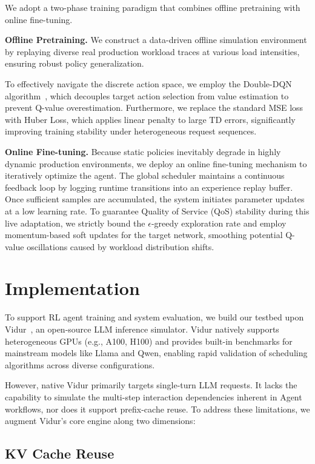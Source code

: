 \documentclass[sigconf,review,anonymous]{acmart}
\begin{document}
We adopt a two-phase training paradigm that combines offline pretraining 
with online fine-tuning.

\textbf{Offline Pretraining.}
We construct a data-driven offline simulation environment by replaying
diverse real production workload traces at various load intensities, 
ensuring robust policy generalization.

To effectively navigate the discrete action space, we employ the
Double-DQN algorithm~\cite{van2016deep}, which decouples
target action selection from value estimation to prevent Q-value
overestimation. 
Furthermore, we replace the standard MSE loss with Huber Loss, which
applies linear penalty to large TD errors, significantly improving
training stability under heterogeneous request sequences.

\textbf{Online Fine-tuning.}
Because static policies inevitably degrade in highly dynamic production environments, 
we deploy an online fine-tuning mechanism to iteratively optimize the agent. The global 
scheduler maintains a continuous feedback loop by logging runtime transitions into an 
experience replay buffer. Once sufficient samples are accumulated, the system initiates 
parameter updates at a low learning rate. To guarantee Quality of Service (QoS) stability 
during this live adaptation, 
we strictly bound the $\epsilon$-greedy exploration rate and employ momentum-based soft 
updates for the target network, smoothing potential Q-value oscillations caused by workload 
distribution shifts.

\section{Implementation}\label{sec:implementation}

To support RL agent training and system evaluation, we build our testbed upon 
Vidur~\cite{agrawal2024vidur}, an open-source LLM inference simulator. 
Vidur natively supports heterogeneous GPUs (e.g., A100, H100) and provides 
built-in benchmarks for mainstream models like Llama and Qwen, enabling rapid 
validation of scheduling algorithms across diverse configurations.

However, native Vidur primarily targets single-turn LLM requests. 
It lacks the capability to simulate the multi-step interaction dependencies 
inherent in Agent workflows, nor does it support prefix-cache reuse. 
To address these limitations, we augment Vidur's core engine along two dimensions:

\subsection{KV Cache Reuse}
\end{document}
